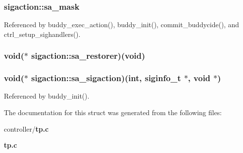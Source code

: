 \subsubsection[{sa\_\-mask}]{ {\bf sigaction::sa\_\-mask}}\label{structsigaction_aeecd65682885b6da3cd8b24ebb9a7e4b}


Referenced by buddy\_\-exec\_\-action(), buddy\_\-init(), commit\_\-buddycide(), and ctrl\_\-setup\_\-sighandlers().

\subsubsection[{sa\_\-restorer}]{\setlength{\rightskip}{0pt plus 5cm}void($\ast$ {\bf sigaction::sa\_\-restorer})(void)}\label{structsigaction_a59e4a1b183425f92f2a102a6ce7691b2}
\subsubsection[{sa\_\-sigaction}]{\setlength{\rightskip}{0pt plus 5cm}void($\ast$ {\bf sigaction::sa\_\-sigaction})(int, {\bf siginfo\_\-t} $\ast$, void $\ast$)}\label{structsigaction_a93e1e3dcb806bc2c6c28a936694ef600}


Referenced by buddy\_\-init().



The documentation for this struct was generated from the following files:\begin{DoxyCompactItemize}
\item 
controller/{\bf tp.c}\item 
{\bf tp.c}\end{DoxyCompactItemize}
